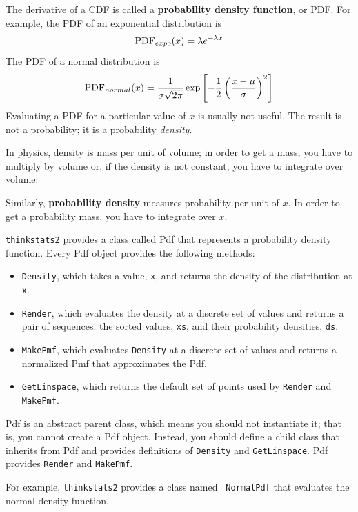\documentclass[12pt]{book}
\begin{document}
The derivative of a CDF is called a {\bf probability density function},
or PDF.  For example, the PDF of an exponential distribution is
%
\[ \mathrm{PDF}_{expo}(x) = \lambda e^{-\lambda x}   \]
%
The PDF of a normal distribution is
%
\[ \mathrm{PDF}_{normal}(x) = \frac{1}{\sigma \sqrt{2 \pi}} 
                 \exp \left[ -\frac{1}{2} 
                 \left( \frac{x - \mu}{\sigma} \right)^2 \right]  \]
%
Evaluating a PDF for a particular value of $x$ is usually not useful.
The result is not a probability; it is a probability {\em density}.

In physics, density is mass per unit of
volume; in order to get a mass, you have to multiply by volume or,
if the density is not constant, you have to integrate over volume.

Similarly, {\bf probability density} measures probability per unit of $x$.
In order to get a probability mass, you have to integrate over $x$.

{\tt thinkstats2} provides a class called Pdf that represents
a probability density function.  Every Pdf object provides the
following methods:

\begin{itemize}

\item {\tt Density}, which takes a value, {\tt x}, and returns the
  density of the distribution at {\tt x}.

\item {\tt Render}, which evaluates the density at a discrete set of
  values and returns a pair of sequences: the sorted values, {\tt xs},
  and their probability densities, {\tt ds}.

\item {\tt MakePmf}, which evaluates {\tt Density}
  at a discrete set of values and returns a normalized Pmf that
  approximates the Pdf.

\item {\tt GetLinspace}, which returns the default set of points used 
  by {\tt Render} and {\tt MakePmf}.

\end{itemize}  

Pdf is an abstract parent class, which means you should not
instantiate it; that is, you cannot create a Pdf object.  Instead, you
should define a child class that inherits from Pdf and provides
definitions of {\tt Density} and {\tt GetLinspace}.  Pdf provides
{\tt Render} and {\tt MakePmf}.

For example, {\tt thinkstats2} provides a class named {\tt
  NormalPdf} that evaluates the normal density function.
\end{document}

